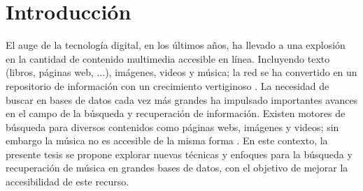 \chapter*{Introducción}\label{chapter:introduction}
El auge de la tecnología digital, en los últimos años, ha llevado a una explosión en la cantidad de contenido multimedia accesible en línea. Incluyendo texto (libros, páginas web, ...), imágenes, videos y música; la red se ha convertido en un repositorio de información con un crecimiento vertiginoso \cite{owidinternet}. La necesidad de buscar en bases de datos cada vez más grandes ha impulsado importantes avances en el campo de la búsqueda y recuperación de información. Existen motores de búsqueda para diversos contenidos como páginas webs, imágenes y videos; sin embargo la música no es accesible de la misma forma \cite{Koepke2021AudioRW}. En este contexto, la presente tesis se propone explorar nuevas técnicas y enfoques para la búsqueda y recuperación de música en grandes bases de datos, con el objetivo de mejorar la accesibilidad de este recurso. \\
